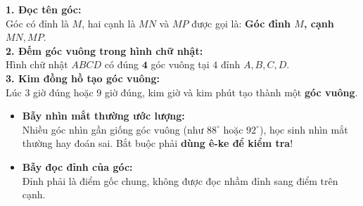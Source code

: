 \documentclass[12pt,a4paper]{article}
\begin{document}
\vspace{-2.5mm}
\noindent
\begin{minipage}[t]{0.49\textwidth}\vspace{0pt}
\begin{tcolorbox}[
  enhanced,
  colback=green!4!white,
  colframe=green!60!black,
  arc=2mm, boxrule=0.8pt,
  left=2mm, right=2mm, top=1.8mm, bottom=1.8mm,
  title={\footnotesize\bfseries\color{white}\faCheckCircle\ Ví dụ thực hành chuẩn mực}
]
{\footnotesize
\textbf{1. Đọc tên góc:}\\
Góc có đỉnh là $M$, hai cạnh là $MN$ và $MP$ được gọi là: \textbf{Góc đỉnh $M$, cạnh $MN, MP$}.\\
\textbf{2. Đếm góc vuông trong hình chữ nhật:}\\
Hình chữ nhật $ABCD$ có đúng $\mathbf{4}$ góc vuông tại $4$ đỉnh $A, B, C, D$.\\
\textbf{3. Kim đồng hồ tạo góc vuông:}\\
Lúc $3$ giờ đúng hoặc $9$ giờ đúng, kim giờ và kim phút tạo thành một \textbf{góc vuông}.
}
\end{tcolorbox}
\end{minipage}
\hfill
\begin{minipage}[t]{0.49\textwidth}\vspace{0pt}
\begin{tcolorbox}[
  enhanced,
  colback=red!4!white,
  colframe=red!70!black,
  arc=2mm, boxrule=0.8pt,
  left=2mm, right=2mm, top=1.8mm, bottom=1.8mm,
  title={\footnotesize\bfseries\color{white}\faExclamationTriangle\ Mẹo tránh bẫy trắc nghiệm}
]
{\footnotesize
\begin{itemize}\setlength{\itemsep}{1.5pt}\setlength{\leftskip}{-2.5mm}
  \item \textbf{Bẫy nhìn mắt thường ước lượng:}\\
  Nhiều góc nhìn gần giống góc vuông (như $88^\circ$ hoặc $92^\circ$), học sinh nhìn mắt thường hay đoán sai. Bắt buộc phải \textbf{dùng ê-ke để kiểm tra}!
  \item \textbf{Bẫy đọc đỉnh của góc:}\\
  Đỉnh phải là điểm gốc chung, không được đọc nhầm đỉnh sang điểm trên cạnh.
\end{itemize}
}
\end{tcolorbox}
\end{minipage}
\end{document}
